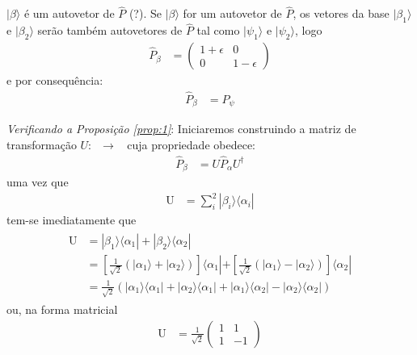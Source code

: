 \begin{prob}
\begin{sol}
\begin{enumerate}[label=\alph *)]
\begin{propos}{$|{\beta}\rangle$ é um autovetor de $\hat{P}$ (?).}
							Se $|{\beta}\rangle$ for um autovetor de $\hat{P}$, os vetores da base $|{\beta_{1}}\rangle$ e $|{\beta_{2}}\rangle$ serão também autovetores de $\hat{P}$ tal como $|{\psi_{1}}\rangle$ e $|{\psi_{2}}\rangle$, logo
						\begin{align}
							\hat{P}_{\beta} &=
							\begin{pmatrix}
								1+\epsilon & 0 \\
								0 & 1-\epsilon
							\end{pmatrix}
						\end{align}
						e por consequência:
						\begin{align}
							\hat{P}_{\beta} &= \hat{P}_{\psi}
						\end{align}
						\end{propos}
						\textit{Verificando a Proposição \ref{prop:1}}:
						Iniciaremos construindo a matriz de transformação $U:\mathop{P_{\alpha}}\to\mathop{P_{\beta}}$ cuja propriedade obedece:
						\begin{align}
							\label{eq:propriedade-u}
							\hat{P}_{\beta} &= U\hat{P}_{\alpha}U^{\dag}
						\end{align}
						uma vez que
						\begin{align}
							\mathop{U} &= \sum_{i}^{2}|{\beta_{i}}\rangle \langle{\alpha_{i}}|
						\end{align}					
						tem-se imediatamente que
						\begin{align}
							\begin{split}
								\mathop{U} &= |{\beta_{1}}\rangle \langle{\alpha_{1}}|+|{\beta_{2}}\rangle \langle{\alpha_{2}}|\\
													 &= \left[\frac{1}{\sqrt{2}}\left(|{\alpha_{1}}\rangle+|{\alpha_{2}}\rangle\right)\right]\langle{\alpha_{1}}|+\left[\frac{1}{\sqrt{2}}\left(|{\alpha_{1}}\rangle-|{\alpha_{2}}\rangle\right)\right]\langle{\alpha_{2}}|\\
													 &= \frac{1}{\sqrt{2}}\left(|{\alpha_{1}}\rangle \langle{\alpha_{1}}|+|{\alpha_{2}}\rangle \langle{\alpha_{1}}|+|{\alpha_{1}}\rangle \langle{\alpha_{2}}|-|{\alpha_{2}}\rangle \langle{\alpha_{2}}|\right)
							\end{split}
						\end{align}
						ou, na forma matricial
						\begin{align}
							\mathop{U} &=\frac{1}{\sqrt{2}}
							\begin{pmatrix}
								1 & 1 \\
								1 & -1
							\end{pmatrix}

\end{align}
\end{enumerate}
\end{sol}
\end{prob}
